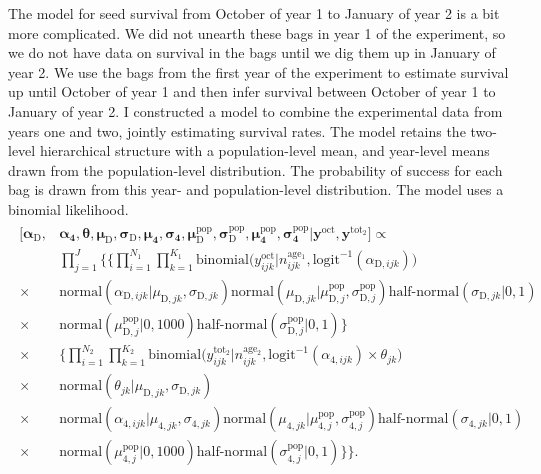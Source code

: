 \documentclass[12pt, oneside, titlepage]{article}   	%
\begin{document}
The model for seed survival from October of year 1 to January of year 2 is a bit more complicated. We did not unearth these bags in year 1 of the experiment, so we do not have data on survival in the bags until we dig them up in January of year 2. We use the bags from the first year of the experiment to estimate survival up until October of year 1 and then infer survival between October of year 1 to January of year 2. I constructed a model to combine the experimental data from years one and two, jointly estimating survival rates. The model retains the two-level hierarchical structure with a population-level mean, and year-level means drawn from the population-level distribution. The probability of success for each bag is drawn from this year- and population-level distribution. The model uses a binomial likelihood. 
%
\begin{align}
  \begin{split}
  [  \bm{\alpha_\mathrm{D}} , &  \bm{\alpha_4}, \bm{\theta}, \bm{\mu_\mathrm{D}} , \bm{\sigma_\mathrm{D}} , \bm{\mu_4} , \bm{\sigma_4} , \bm{\mu^\mathrm{pop}_\mathrm{D}}, \bm{\sigma^\mathrm{pop}_\mathrm{D}} , \bm{\mu^\mathrm{pop}_4}, \bm{\sigma^\mathrm{pop}_4} | \bm{y^\mathrm{oct}} , \bm{y^\mathrm{tot_2}}  ]  \propto  \\  
 	     & \prod_{j=1}^{J} \bigg\{ \Big\{ \prod_{i=1}^{N_1}  \prod_{k=1}^{K_1} \mathrm{binomial} \big( y^{\mathrm{oct}}_{ijk} | n^\mathrm{age_1}_{ijk}, \mathrm{logit}^{-1}( \alpha_{\mathrm{D},ijk} ) \big) \\
	      \times & \mathrm{normal} ( \alpha_{\mathrm{D},ijk}  | \mu_{\mathrm{D},jk}, \sigma{_{\mathrm{D},jk} }) \mathrm{normal} ( \mu_{\mathrm{D},jk}  | \mu^\mathrm{pop}_{\mathrm{D},j}, \sigma^\mathrm{pop}_{\mathrm{D},j} ) 
 \textrm{half-normal} ( \sigma_{\mathrm{D},jk} | 0,1) \\
 \times & \mathrm{normal} ( \mu^\mathrm{pop}_{\mathrm{D},j} | 0 , 1000 ) \textrm{half-normal} ( \sigma^\mathrm{pop}_{\mathrm{D},j} | 0,1)   \Big\}  \\
  \times &  \Big\{ \prod_{i=1}^{N_2}  \prod_{k=1}^{K_2}   \mathrm{binomial} \big( y^{\mathrm{tot_2}}_{ijk} | n^\mathrm{age_2}_{ijk}, \mathrm{logit}^{-1}( \alpha_{\mathrm{4},ijk} ) \times \theta_{jk} \big) \\
   \times & \mathrm{normal} ( \theta_{jk}  | \mu_{\mathrm{D},jk}, \sigma{_{\mathrm{D},jk} }) \\
    \times & \mathrm{normal} ( \alpha_{\mathrm{4},ijk}  | \mu_{\mathrm{4},jk}, \sigma{_{\mathrm{4},jk} }) \mathrm{normal} ( \mu_{\mathrm{4},jk}  | \mu^\mathrm{pop}_{\mathrm{4},j}, \sigma^\mathrm{pop}_{\mathrm{4},j} ) \textrm{half-normal} ( \sigma_{\mathrm{4},jk} | 0,1) \\
    \times & \mathrm{normal} ( \mu^\mathrm{pop}_{\mathrm{4},j} | 0 , 1000 ) \textrm{half-normal} ( \sigma^\mathrm{pop}_{\mathrm{4},j} | 0,1) \Big\}  \bigg\}.
  \end{split}
\end{align}
\end{document}
